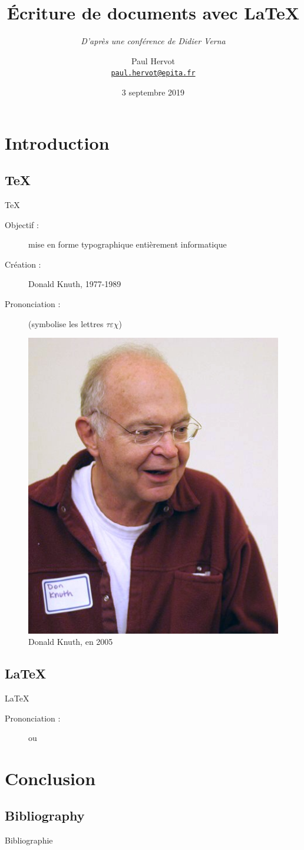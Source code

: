 \documentclass{beamer} %
\title{Écriture de documents avec \LaTeX{}}
\subtitle{\texorpdfstring{\small{\emph{D'après une conférence de Didier Verna}\cite{latexDV}}}
                         {D'après une conférence de Didier Verna}}
\institute{EPITA}
\author{
    \texorpdfstring
    { %
        Paul Hervot\\
        \href{mailto:paul.hervot@epita.fr}{\nolinkurl{paul.hervot@epita.fr}}
    }{ %
        Paul Hervot
    }
}
\date{3 septembre 2019}
\newcommand{\ipa}[1] {
    \foreignlanguage{english}{\textipa{#1}}
}
\begin{document}
\frame{\titlepage{}}

\section{Introduction}
\subsection{\TeX}
\begin{frame}{\TeX}
    \begin{description}
        \item[Objectif :] mise en forme typographique entièrement informatique
        \item[Création :] Donald Knuth, 1977-1989
        \item[Prononciation :] \ipa{[tEx]} (symbolise les lettres $\tau\varepsilon\chi$)
    \end{description}

    \begin{figure}[position]
        \includegraphics[height=0.5\textheight]{img/knuth}
        \caption{Donald Knuth, en 2005}
    \end{figure}
\end{frame}

\subsection{\LaTeX}
\begin{frame}{\LaTeX}
    \begin{description}
        \item[Prononciation :] \ipa{["lA:tEx]} ou \ipa{["leI:tEx]}
    \end{description}
\end{frame}

\section{Conclusion}
\subsection{Bibliography}
\begin{frame}[allowframebreaks]{Bibliographie}
    \printbibliography{}
\end{frame}
\end{document}
